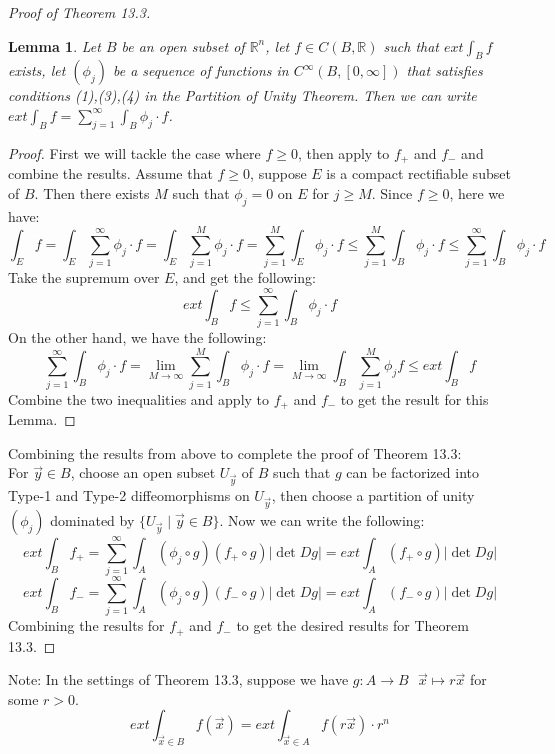 \documentclass[11pt,oneside]{book}
\theoremstyle{break}
\theoremstyle{break}
\newtheorem{lem}{Lemma}[thm]
\newcommand{\R}{\mathbb{R}}
\newcommand{\note}{\color{red}Note: \color{black}}
\begin{document}
\begin{proof}[Proof of Theorem 13.3]
\begin{lem}\setlength{\leftskip}{1cm}
Let $B$ be an open subset of $\R^n$, let $f \in C(B ,\R)$ such that $ext\int_B f$ exists, let $(\phi_j)$ be a sequence of functions in $C^\infty(B,[0,\infty])$ that satisfies conditions (1),(3),(4) in the Partition of Unity Theorem. Then we can write $ext\int_B f = \sum_{j =1}^\infty \int_B \phi_j \cdot f$.
\end{lem}
\begin{proof}\setlength{\leftskip}{1cm}
First we will tackle the case where $f\geq 0$, then apply to $f_+$ and $f_-$ and combine the results. Assume that $f \geq 0$, suppose $E$ is a compact rectifiable subset of $B$. Then there exists $M$ such that $\phi_j = 0$ on $E$ for $j \geq M$. Since $f \geq 0$, here we have:
$$\int_E f = \int_E \sum_{j=1}^\infty \phi_j\cdot f = \int_E \sum_{j=1}^M \phi_j \cdot f = \sum_{j=1}^M \int_E \phi_j \cdot f  \leq \sum_{j=1}^M \int_B \phi_j \cdot f \leq \sum_{j=1}^\infty \int_B \phi_j \cdot f$$
Take the supremum over $E$, and get the following:
$$ext \int_B f \leq \sum_{j=1}^\infty \int_B \phi_j \cdot f$$
On the other hand, we have the following:
$$\sum_{j=1}^\infty \int_B \phi_j\cdot f = \lim_{M \to \infty} \sum_{j=1}^M \int_B \phi_j\cdot f = \lim_{M\to \infty} \int_B \sum_{j=1}^M \phi_j f \leq ext\int_B f$$
Combine the two inequalities and apply to $f_+$ and $f_-$ to get the result for this Lemma.
\end{proof}

Combining the results from above to complete the proof of Theorem 13.3:\\

For $\vec{y}\in B$, choose an open subset $U_{\vec{y}}$ of $B$ such that $g$ can be factorized into Type-1 and Type-2 diffeomorphisms on $U_{\vec{y}}$, then choose a partition of unity $(\phi_j)$ dominated by $\{U_{\vec{y}} \mid \vec{y}\in B \}$. Now we can write the following:
$$ext\int_B f_+ = \sum_{j=1}^\infty \int_A (\phi_j \circ g) (f_+\circ g) |\det Dg| = ext \int_A (f_+\circ g)|\det Dg| $$
$$ext\int_B f_- = \sum_{j=1}^\infty \int_A (\phi_j \circ g) (f_-\circ g) |\det Dg| = ext \int_A (f_-\circ g)|\det Dg| $$
Combining the results for $f_+$ and $f_-$ to get the desired results for Theorem 13.3.
\end{proof}


\note In the settings of Theorem 13.3, suppose we have $g :A \to B \ \ \  \vec{x}\mapsto r \vec{x}$ for some $r >0$.
$$ext \int_{\vec{x}\in B} f(\vec{x}) = ext\int_{\vec{x}\in A} f(r\vec{x})\cdot r^n$$
\end{document}
